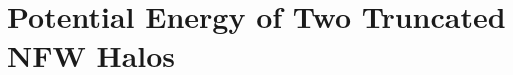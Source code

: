 
\clearpage

\appendix
%
% 
%
%
%
\section{Potential Energy of Two Truncated NFW Halos}\label{potentialsec}

